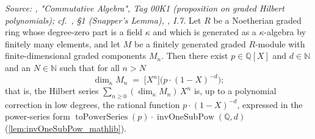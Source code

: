 \begin{lemma}\leanok
  \label{lem:gradedHilbertSerre_rational}
  \textit{Source: \cite{stacks-project}, "Commutative Algebra", Tag 00K1
  (proposition on graded Hilbert polynomials); cf.\ \cite{nitsure-hilbert-quot}, \S 1 (Snapper's
  Lemma), \cite{hartshorne-ag}, I.7.}
  Let \(R\) be a Noetherian graded ring whose degree-zero part is a field
  \(\kappa\) and which is generated as a \(\kappa\)-algebra by finitely many
  elements, and let \(M\) be a finitely generated graded \(R\)-module with
  finite-dimensional graded components \(M_n\). Then there exist
  \(p \in \mathbb{Q}[X]\) and \(d \in \mathbb{N}\) and an \(N \in \mathbb{N}\)
  such that for all \(n > N\)
  \[
    \dim_{\kappa} M_n \;=\; \bigl[ X^n \bigr]\bigl( p \cdot (1 - X)^{-d}\bigr);
  \]
  that is, the Hilbert series \(\sum_{n \ge 0} (\dim_\kappa M_n)\, X^n\) is, up to
  a polynomial correction in low degrees, the rational function
  \(p \cdot (1 - X)^{-d}\), expressed in the power-series form
  \(\operatorname{toPowerSeries}(p) \cdot \operatorname{invOneSubPow}(\mathbb{Q}, d)\)
  (\cref{lem:invOneSubPow_mathlib}).


\end{lemma}
